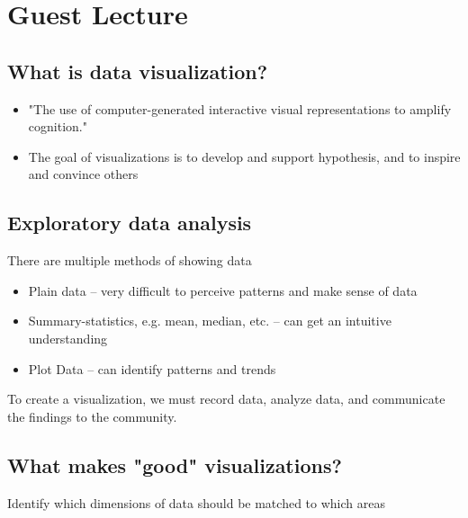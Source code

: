 
\section{Guest Lecture}

\subsection{What is data visualization?}
\begin{itemize}
  \item "The use of computer-generated interactive visual representations to amplify cognition."
  \item The goal of visualizations is to develop and support hypothesis, and to inspire and convince others
\end{itemize}

\subsection{Exploratory data analysis}
There are multiple methods of showing data
\begin{itemize}
  \item Plain data -- very difficult to perceive patterns and make sense of data
  \item Summary-statistics, e.g. mean, median, etc. -- can get an intuitive understanding
  \item Plot Data -- can identify patterns and trends
\end{itemize}
To create a visualization, we must record data, analyze data, and communicate the findings to the community.

\subsection{What makes "good" visualizations?}

Identify which dimensions of data should be matched to which areas
